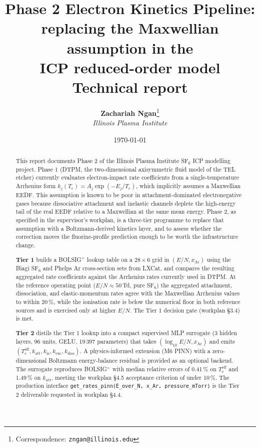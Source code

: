 \documentclass[11pt,a4paper]{article}
\title{\textbf{Phase 2 Electron Kinetics Pipeline}:\\
       replacing the Maxwellian assumption in the\\
       \sfsix{} ICP reduced-order model\\[2pt]
       \large Technical report}
\author{%
  \textbf{Zachariah Ngan}\thanks{%
    Correspondence: \texttt{zngan@illinois.edu}}\\[2pt]
  \normalsize\itshape Illinois Plasma Institute}
\date{\today}
\newcommand{\kdiss}{k_{\mathrm{diss}}}
\newcommand{\kiz}{k_{\mathrm{iz}}}
\newcommand{\katt}{k_{\mathrm{att}}}
\begin{document}
\maketitle

\begin{abstract}
\noindent
This report documents Phase 2 of the Illinois Plasma Institute
SF$_6$ ICP modelling project. Phase 1 (DTPM, the two-dimensional
axisymmetric fluid model of the TEL etcher) currently evaluates
electron-impact rate coefficients from a single-temperature
Arrhenius form $k_j(T_e) = A_j \exp(-E_j/T_e)$, which implicitly
assumes a Maxwellian EEDF. This assumption is known to be poor in
attachment-dominated electronegative gases because dissociative
attachment and inelastic channels deplete the high-energy tail of
the real EEDF relative to a Maxwellian at the same mean energy.
Phase 2, as specified in the supervisor's workplan, is a three-tier
programme to replace that assumption with a Boltzmann-derived
kinetics layer, and to assess whether the correction moves the
fluorine-profile prediction enough to be worth the infrastructure
change.

\textbf{Tier 1} builds a BOLSIG$^+$ lookup table on a
$28 \times 6$ grid in $(E/N, x_{\mathrm{Ar}})$ using the Biagi
SF$_6$ and Phelps Ar cross-section sets from LXCat, and compares
the resulting aggregated rate coefficients against the Arrhenius
rates currently used in DTPM. At the reference operating point
($E/N \approx 50$\,Td, pure SF$_6$) the aggregated attachment,
dissociation, and elastic-momentum rates agree with the Maxwellian
Arrhenius values to within 20\,\%, while the ionisation rate is
below the numerical floor in both reference sources and is
exercised only at higher $E/N$. The Tier 1 decision gate (workplan
§3.4) is met.

\textbf{Tier 2} distils the Tier 1 lookup into a compact supervised
MLP surrogate (3 hidden layers, 96 units, GELU, 19\,397 parameters)
that takes $(\log_{10} E/N, x_{\mathrm{Ar}})$ and emits
$(T_e^{\mathrm{eff}}, \katt, \kiz, k_{\mathrm{exc}}, \kdiss)$. A
physics-informed extension (M6 PINN) with a zero-dimensional
Boltzmann energy-balance residual is provided as an optional
backend. The surrogate reproduces BOLSIG$^+$ with median relative
errors of 0.41\,\% on $T_e^{\mathrm{eff}}$ and 1.49\,\% on
$\katt$, meeting the workplan §4.5 acceptance criterion of under
10\,\%. The production interface
\texttt{get\_rates\_pinn(E\_over\_N, x\_Ar, pressure\_mTorr)} is
the Tier 2 deliverable requested in workplan §4.4.


\end{abstract}
\end{document}
